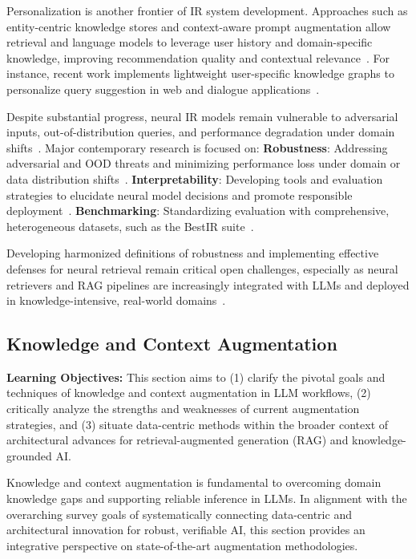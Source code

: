\documentclass[sigconf]{acmart}
\begin{document}
Personalization is another frontier of IR system development. Approaches such as entity-centric knowledge stores and context-aware prompt augmentation allow retrieval and language models to leverage user history and domain-specific knowledge, improving recommendation quality and contextual relevance~\cite{ref8,ref10,ref14,ref15,ref17,ref26,ref28,ref36,ref37,ref38,ref43,ref52,ref54}. For instance, recent work implements lightweight user-specific knowledge graphs to personalize query suggestion in web and dialogue applications~\cite{ref36,ref37}.

Despite substantial progress, neural IR models remain vulnerable to adversarial inputs, out-of-distribution queries, and performance degradation under domain shifts~\cite{ref7,ref20,ref26,ref46,ref54,ref63,ref64}. Major contemporary research is focused on:
\textbf{Robustness}: Addressing adversarial and OOD threats and minimizing performance loss under domain or data distribution shifts~\cite{ref26,ref46}.
\textbf{Interpretability}: Developing tools and evaluation strategies to elucidate neural model decisions and promote responsible deployment~\cite{ref26,ref63}.
\textbf{Benchmarking}: Standardizing evaluation with comprehensive, heterogeneous datasets, such as the BestIR suite~\cite{ref7,ref26,ref63,ref64}.

Developing harmonized definitions of robustness and implementing effective defenses for neural retrieval remain critical open challenges, especially as neural retrievers and RAG pipelines are increasingly integrated with LLMs and deployed in knowledge-intensive, real-world domains~\cite{ref7,ref26,ref63,ref64}.

\subsection{Knowledge and Context Augmentation}

\textbf{Learning Objectives:} This section aims to (1) clarify the pivotal goals and techniques of knowledge and context augmentation in LLM workflows, (2) critically analyze the strengths and weaknesses of current augmentation strategies, and (3) situate data-centric methods within the broader context of architectural advances for retrieval-augmented generation (RAG) and knowledge-grounded AI.

Knowledge and context augmentation is fundamental to overcoming domain knowledge gaps and supporting reliable inference in LLMs. In alignment with the overarching survey goals of systematically connecting data-centric and architectural innovation for robust, verifiable AI, this section provides an integrative perspective on state-of-the-art augmentation methodologies.
\end{document}
